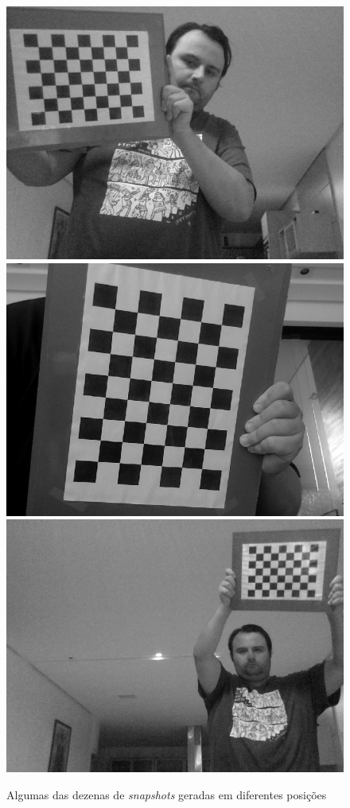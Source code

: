 \documentclass[conference]{IEEEtran}
\begin{document}
\begin{figure}[!htb]
\endminipage\hfill
{}
  \includegraphics[width=\linewidth]{snap-4.png}
\endminipage\hfill
{}
  \includegraphics[width=\linewidth]{snap-5.png}
\endminipage\hfill
{}%
  \includegraphics[width=\linewidth]{snap-6.png}
\endminipage\hfill
\caption{Algumas das dezenas de \textit{snapshots} geradas em diferentes posições}
\end{figure}
\end{document}
